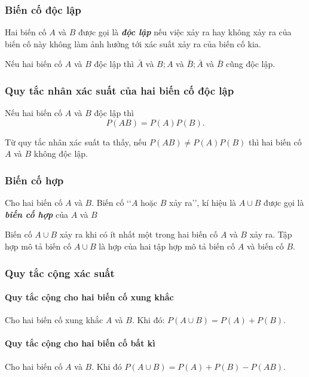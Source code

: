 \begin{tomtat}
	\subsubsection{Biến cố độc lập}
	\begin{boxdn}
	Hai biến cố $A$ và $B$ được gọi là {\bf \textit{độc lập}} nếu việc xảy ra hay không xảy ra của biến cố này không làm ảnh hưởng tới xác suất xảy ra của biến cố kia.
	\end{boxdn}
	\begin{nx}
	Nếu hai biến cố $A$ và $B$ độc lập thì $\bar{A}$ và $B ; A$ và $\bar{B} ; \bar{A}$ và $\bar{B}$ cũng độc lập.
	\end{nx}	
	\subsubsection{Quy tắc nhân xác suất của hai biến cố độc lập}
	\begin{boxdn}
	Nếu hai biến cố $A$ và $B$ độc lập thì
	$$P(A B)=P(A) P(B).$$
	\end{boxdn}
	\begin{note}
	Từ quy tắc nhân xác suất ta thấy, nếu $P(A B) \neq P(A) P(B)$ thì hai biến cố $A$ và $B$ không độc lập.
	\end{note}
	\subsubsection{Biến cố hợp}
\begin{boxdn}
	{Cho hai biến cố $A$ và $B$. Biến cố \lq\lq$A$ hoặc $B$ xảy ra\rq\rq, kí hiệu là $A\cup B$ được gọi là \textbf{\textit{biến cố hợp}} của $A$ và $B$}
\end{boxdn}
\begin{note}
	{Biến cố $A \cup B$ xảy ra khi có ít nhất một trong hai biến cố $A$ và $B$ xảy ra. Tập hợp mô tả biến cố $A \cup B$ là hợp của hai tập hợp mô tả biến cố $A$ và biến cố $B$.}
\end{note}
\subsubsection{Quy tắc cộng xác suất}
\paragraph{Quy tắc cộng cho hai biến cố xung khắc}
\begin{boxdn}
	{Cho hai biến cố xung khắc $A$ và $B$. Khi đó: $P(A \cup B)=P(A)+P(B)$.}
\end{boxdn}
\paragraph{Quy tắc cộng cho hai biến cố bất kì}
\begin{boxdn}
	{Cho hai biến cố $A$ và $B$. Khi đó $P(A \cup B)=P(A)+P(B)-P(A B)$.}
\end{boxdn}
\end{tomtat}
